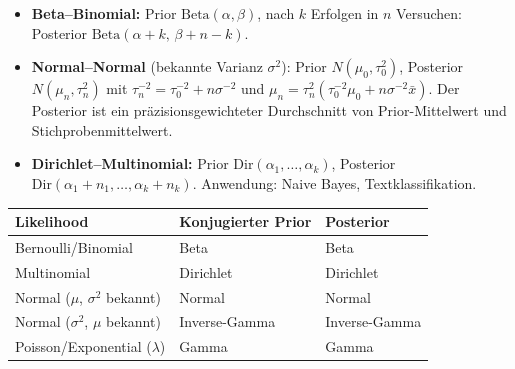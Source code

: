 
\begin{itemize}[leftmargin=1.5em]
    \item \textbf{Beta--Binomial:} Prior $\text{Beta}(\alpha,\beta)$, nach $k$ Erfolgen in $n$ Versuchen: Posterior $\text{Beta}(\alpha+k,\, \beta+n-k)$.
    \item \textbf{Normal--Normal} (bekannte Varianz $\sigma^2$): Prior $N(\mu_0,\tau_0^2)$, Posterior $N(\mu_n,\tau_n^2)$ mit $\tau_n^{-2} = \tau_0^{-2} + n\sigma^{-2}$ und $\mu_n = \tau_n^2(\tau_0^{-2}\mu_0 + n\sigma^{-2}\bar{x})$. Der Posterior ist ein präzisionsgewichteter Durchschnitt von Prior-Mittelwert und Stichprobenmittelwert.
    \item \textbf{Dirichlet--Multinomial:} Prior $\text{Dir}(\alpha_1,\ldots,\alpha_k)$, Posterior $\text{Dir}(\alpha_1+n_1,\ldots,\alpha_k+n_k)$. Anwendung: Naive Bayes, Textklassifikation.
\end{itemize}

\begin{table}[h]
    \centering\small
    \begin{tabular}{lll}
        \toprule
        \textbf{Likelihood} & \textbf{Konjugierter Prior} & \textbf{Posterior} \\
        \midrule
        Bernoulli/Binomial & Beta & Beta \\
        Multinomial & Dirichlet & Dirichlet \\
        Normal ($\mu$, $\sigma^2$ bekannt) & Normal & Normal \\
        Normal ($\sigma^2$, $\mu$ bekannt) & Inverse-Gamma & Inverse-Gamma \\
        Poisson/Exponential ($\lambda$) & Gamma & Gamma \\
        \bottomrule
    \end{tabular}
\end{table}



